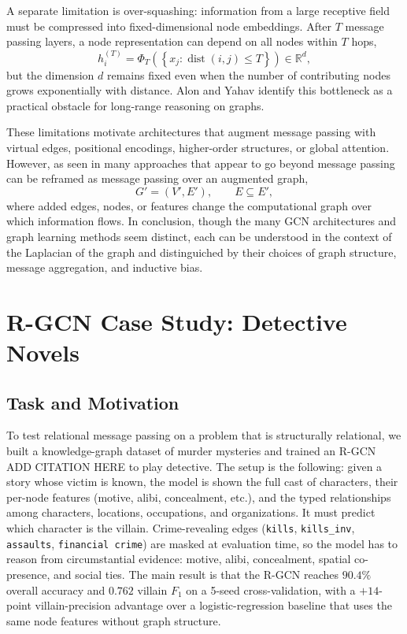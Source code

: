 \documentclass[11pt]{article}
\begin{document}
A separate limitation is over-squashing: information from a large receptive field must be compressed into fixed-dimensional node embeddings. After $T$ message passing layers, a node representation can depend on all nodes within $T$ hops,
\[
    h_i^{(T)}
    = \Phi_T\!\left(\left\{x_j : \operatorname{dist}(i,j)\leq T\right\}\right)
    \in \mathbb{R}^d,
\]
but the dimension $d$ remains fixed even when the number of contributing nodes grows exponentially with distance. Alon and Yahav \cite{alon2021bottleneck} identify this bottleneck as a practical obstacle for long-range reasoning on graphs.

These limitations motivate architectures that augment message passing with virtual edges, positional encodings, higher-order structures, or global attention.
However, as seen in \cite{velickovic2022message} many approaches that appear to go beyond message passing can be reframed as message passing over an augmented graph,
\[
    G' = (V',E'),
    \qquad
    E \subseteq E',
\]
where added edges, nodes, or features change the computational graph over which information flows.
In conclusion, though the many GCN architectures and graph learning methods seem distinct, each can be understood in the context of the Laplacian of the graph and distinguiched by their choices of graph structure, message aggregation, and inductive bias.

\section{R-GCN Case Study: Detective Novels}
\label{sec:detective}

\subsection{Task and Motivation}
To test relational message passing on a problem that is structurally relational, we built a knowledge-graph dataset of murder mysteries and trained an R-GCN \cite{} ADD CITATION HERE to play detective. The setup is the following: given a story whose victim is known, the model is shown the full cast of characters, their per-node features (motive, alibi, concealment, etc.), and the typed relationships among characters, locations, occupations, and organizations. It must predict which character is the villain. Crime-revealing edges (\texttt{kills}, \texttt{kills\_inv}, \texttt{assaults}, \texttt{financial crime}) are masked at evaluation time, so the model has to reason from circumstantial evidence: motive, alibi, concealment, spatial co-presence, and social ties. The main result is that the R-GCN reaches $90.4\%$ overall accuracy and $0.762$ villain $F_1$ on a 5-seed cross-validation, with a $+14$-point villain-precision advantage over a logistic-regression baseline that uses the same node features without graph structure.
\end{document}
